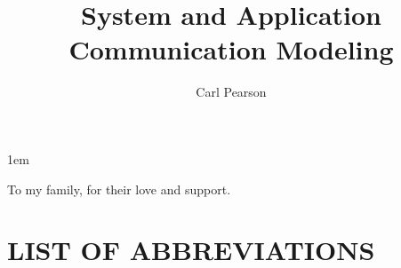 \documentclass[draftthesis,tocnosub,noragright,centerchapter,12pt]{uiucecethesis09}
\title{System and Application Communication Modeling}
\author{Carl Pearson}
\begin{document}
%

%
\maketitle

\parindent 1em%

\frontmatter

%
\begin{abstract}

\end{abstract}


%
\begin{dedication}
To my family, for their love and support.
\end{dedication}

%
\begin{acknowledgments}

\end{acknowledgments}

%
\tableofcontents

%
\listoftables

%
\listoffigures

%
\chapter{LIST OF ABBREVIATIONS}
\end{document}
